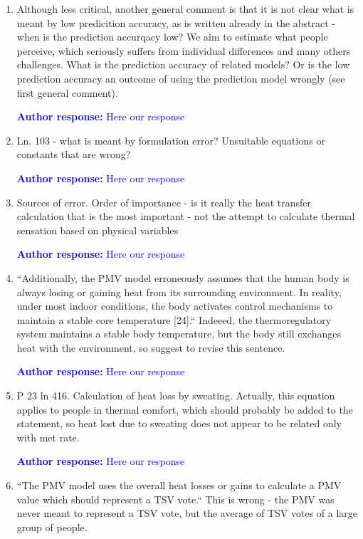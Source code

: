 \documentclass[a4paper, 10pt]{letter}
\newcommand{\response}[1]{\textcolor{blue}{\textbf{Author response:} #1}}
\begin{document}
\begin{letter}
\begin{enumerate}
            \response{Here our response}

            \item Although less critical, another general comment is that it is not clear what is meant by low predicition accuracy, as is written already in the abstract - when is the prediction accurqacy low?
            We aim to estimate what people perceive, which seriously suffers from individual differences and many others challenges.
            What is the prediction accuracy of related models?
            Or is the low prediction accuracy an outcome of using the prediction model wrongly (see first general comment).

            \response{Here our response}

            \item Ln. 103 - what is meant by formulation error?
            Unsuitable equations or constants that are wrong?

            \response{Here our response}

            \item Sources of error.
            Order of importance - is it really the heat transfer calculation that is the most important - not the attempt to calculate thermal sensation based on physical variables

            \response{Here our response}

            \item ``Additionally, the PMV model erroneously assumes that the human body is always losing or gaining heat from its surrounding environment.
            In reality, under most indoor conditions, the body activates control mechanisms to maintain a stable core temperature [24].`` Indeeed, the thermoregulatory system maintains a stable body temperature, but the body still exchanges heat with the environment, so suggest to revise this sentence.

            \response{Here our response}

            \item P 23 ln 416.
            Calculation of heat loss by sweating.
            Actually, this equation applies to people in thermal comfort, which should probably be added to the statement, so heat lost due to sweating does not appear to be related only with met rate.

            \response{Here our response}

            \item ``The PMV model uses the overall heat losses or gains to calculate a PMV value which should represent a TSV vote.`` This is wrong - the PMV was never meant to represent a TSV vote, but the average of TSV votes of a large group of people.


\end{enumerate}
\end{letter}
\end{document}
